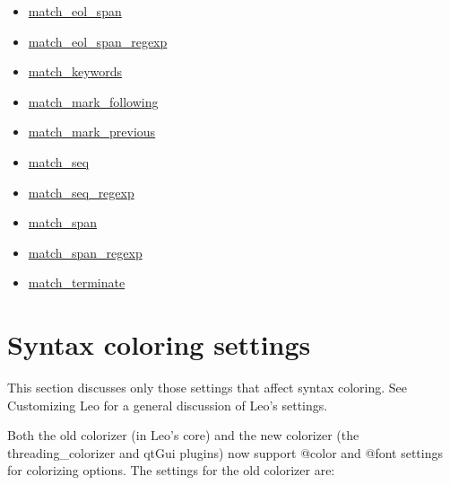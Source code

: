 \documentclass[a4paper,10pt,english]{sphinxmanual}
\begin{document}
{\begin{minipage}{0.95\linewidth}
\begin{itemize}
\begin{itemize}
\begin{itemize}
\item {} 
{\hyperref[coloring:match-eol-span]{match\_eol\_span}}

\item {} 
{\hyperref[coloring:match-eol-span-regexp]{match\_eol\_span\_regexp}}

\item {} 
{\hyperref[coloring:match-keywords]{match\_keywords}}

\item {} 
{\hyperref[coloring:match-mark-following]{match\_mark\_following}}

\item {} 
{\hyperref[coloring:match-mark-previous]{match\_mark\_previous}}

\item {} 
{\hyperref[coloring:match-seq]{match\_seq}}

\item {} 
{\hyperref[coloring:match-seq-regexp]{match\_seq\_regexp}}

\item {} 
{\hyperref[coloring:match-span]{match\_span}}

\item {} 
{\hyperref[coloring:match-span-regexp]{match\_span\_regexp}}

\item {} 
{\hyperref[coloring:match-terminate]{match\_terminate}}

\end{itemize}

\end{itemize}

\end{itemize}
\end{minipage}}
\begin{center}\setlength{\fboxsep}{5pt}\end{center}
\label{coloring:ruleset-names}\label{coloring:ruleset-name}

\section{Syntax coloring settings}
\label{coloring:customizing-leo}\label{coloring:syntax-coloring-settings}
This section discusses only those settings that affect syntax coloring.
See Customizing Leo for a general discussion of Leo's settings.

Both the old colorizer (in Leo's core) and the new colorizer (the
threading\_colorizer and qtGui plugins) now support @color and @font settings for colorizing
options. The settings for the old colorizer are:
\end{document}
